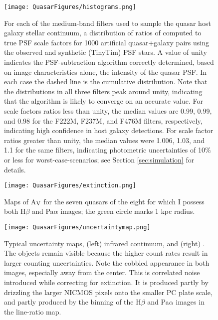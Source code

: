 \begin{figure}%
\begin{center}
   \texttt{[image: QuasarFigures/histograms.png]}
 \caption{For each of the medium-band filters used to sample the quasar host galaxy stellar continuum, a distribution of ratios of computed to true PSF scale factors for 1000 artificial quasar+galaxy pairs using the observed and synthetic (TinyTim) PSF stars. A value of unity indicates the PSF-subtraction algorithm correctly determined, based on image characteristics alone, the intensity of the quasar PSF.  In each case the dashed line is the cumulative distribution. Note that the distributions in all three filters peak around unity, indicating that the algorithm is likely to converge on an accurate value. For scale factors ratios less than unity, the median values are 0.99, 0.99, and 0.98 for the F222M, F237M, and F476M filters, respectively, indicating high confidence in host galaxy detections.  For scale factor ratios greater than unity, the median values were 1.006, 1.03, and 1.1 for the same filters, indicating photometric uncertainties of 10\% or less for worst-case-scenarios; see Section \ref{sec:simulation} for details.}
\label{fig:histogram}
\end{center}
\end{figure}



\begin{figure}%
\begin{center}
   \texttt{[image: QuasarFigures/extinction.png]}
 \caption{Maps of A$_{\rm V}$ for the seven quasars of the eight for which I possess both H$\beta$ and Pa$\alpha$ images; the green circle marks 1 kpc radius.}
\label{reddening}
\end{center}
\end{figure}


\begin{figure}%
\begin{center}
 \texttt{[image: QuasarFigures/uncertaintymap.png]}
  \caption{
    Typical uncertainty maps, (left)  infrared continuum, and (right)  . The objects remain visible because the higher count rates result in larger counting uncertainties. Note the cobbled appearance in both images, especially away from the center.  This is correlated noise introduced while correcting for extinction.  It is produced partly by drizzling the larger NICMOS pixels onto the smaller PC plate scale, and partly produced by the binning of the H$\beta$ and Pa$\alpha$ images in the line-ratio map.
  }
\label{fig:uncertaintymap}
\end{center}
\end{figure}


